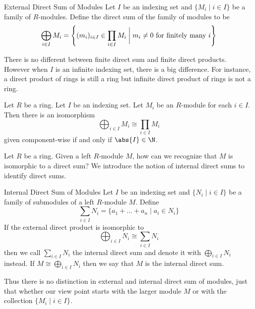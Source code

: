 \documentclass[a4paper]{article}
\begin{document}
\begin{defn}{External Direct Sum of Modules}{} Let $I$ be an indexing set and $\{M_i\;|\;i\in I\}$ be a family of $R$-modules. Define the direct sum of the family of modules to be $$\bigoplus_{i\in I}M_i=\left\{(m_i)_{i\in I}\in\prod_{i\in I}M_i\;\bigg{|}\;m_i\neq 0\text{ for finitely many }i\right\}$$
\end{defn}

There is no different between finite direct sum and finite direct products. However when $I$ is an infinite indexing set, there is a big difference. For instance, a direct product of rings is still a ring but infinite direct product of rings is not a ring. 

\begin{prp}{}{} Let $R$ be a ring. Let $I$ be an indexing set. Let $M_i$ be an $R$-module for each $i\in I$. Then there is an isomorphism $$\bigoplus_{i\in I}M_i\cong\prod_{i\in I}M_i$$ given component-wise if and only if $\abs{I}\in\N$. 
\end{prp}

Let $R$ be a ring. Given a left $R$-module $M$, how can we recognize that $M$ is isomorphic to a direct sum? We introduce the notion of internal direct sums to identify direct sums. 

\begin{defn}{Internal Direct Sum of Modules}{} Let $I$ be an indexing set and $\{N_i\;|\;i\in I\}$ be a family of submodules of a left $R$-module $M$. Define $$\sum_{i\in I}N_i=\{a_1+\dots+a_n\;|\;a_i\in N_i\}$$ If the external direct product is isomorphic to $$\bigoplus_{i\in I}N_i\cong\sum_{i\in I}N_i$$ then we call $\sum_{i\in I}N_i$ the internal direct sum and denote it with $\bigoplus_{i\in I}N_i$ instead. If $M\cong\bigoplus_{i\in I}N_i$ then we say that $M$ is the internal direct sum. 
\end{defn}

Thus there is no distinction in external and internal direct sum of modules, just that whether our view point starts with the larger module $M$ or with the collection $\{M_i\;|\;i\in I\}$. 
\end{document}
